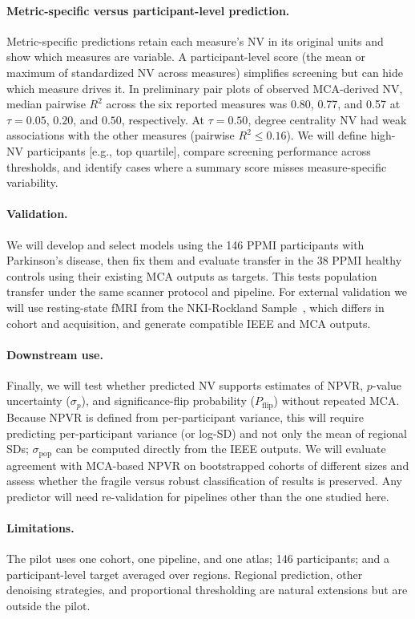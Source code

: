 \paragraph{Metric-specific versus participant-level prediction.}
Metric-specific predictions retain each measure's NV in its original units and show which measures are variable. A participant-level score (the mean or maximum of standardized NV across measures) simplifies screening but can hide which measure drives it. In preliminary pair plots of observed MCA-derived NV, median pairwise $R^2$ across the six reported measures was 0.80, 0.77, and 0.57 at $\tau=0.05$, $0.20$, and $0.50$, respectively. At $\tau=0.50$, degree centrality NV had weak associations with the other measures (pairwise $R^2\leq 0.16$). We will define high-NV participants [e.g., top quartile], compare screening performance across thresholds, and identify cases where a summary score misses measure-specific variability.

\paragraph{Validation.}
We will develop and select models using the 146 PPMI participants with Parkinson's disease, then fix them and evaluate transfer in the 38 PPMI healthy controls using their existing MCA outputs as targets. This tests population transfer under the same scanner protocol and pipeline. For external validation we will use resting-state fMRI from the NKI-Rockland Sample~\cite{Nooner2012NKI}, which differs in cohort and acquisition, and generate compatible IEEE and MCA outputs.

\paragraph{Downstream use.}
Finally, we will test whether predicted NV supports estimates of NPVR, $p$-value uncertainty ($\sigma_p$), and significance-flip probability ($P_{\mathrm{flip}}$) without repeated MCA. Because NPVR is defined from per-participant variance, this will require predicting per-participant variance (or log-SD) and not only the mean of regional SDs; $\sigma_{\mathrm{pop}}$ can be computed directly from the IEEE outputs. We will evaluate agreement with MCA-based NPVR on bootstrapped cohorts of different sizes and assess whether the fragile versus robust classification of results is preserved. Any predictor will need re-validation for pipelines other than the one studied here.

\paragraph{Limitations.}
The pilot uses one cohort, one pipeline, and one atlas; 146 participants; and a participant-level target averaged over regions. Regional prediction, other denoising strategies, and proportional thresholding are natural extensions but are outside the pilot.
